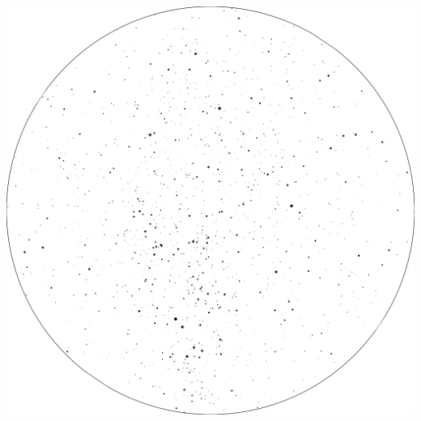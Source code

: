 \documentclass{./SAS-class-skygen}
\begin{document}
	\vspace{0.5cm}
    \begin{center}
    \includegraphics[width=\textwidth]{./pics/skychart50.png}
    \end{center}
    
    
\end{document}
